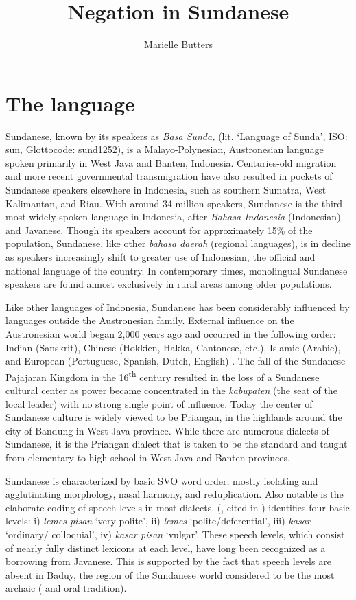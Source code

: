 \documentclass[output=paper]{langscibook}
\title{Negation in Sundanese}
\author{Marielle Butters\affiliation{University of Colorado at Boulder}}
\begin{document}
\maketitle

\section{The language}\label{sec:ngo:1}

Sundanese, known by its speakers as \textit{Basa Sunda,} (lit. ‘Language of Sunda’, ISO: \href{https://iso639-3.sil.org/code/sun}{sun}, Glottocode: \href{https://glottolog.org/resource/languoid/id/sund1252}{sund1252}), is a Malayo-Polynesian, Austronesian language spoken primarily in West Java and Banten, Indonesia. Centuries-old migration and more recent governmental transmigration have also resulted in pockets of Sundanese speakers elsewhere in Indonesia, such as southern Sumatra, West Kalimantan, and Riau. With around 34 million speakers, Sundanese is the third most widely spoken language in Indonesia, after \textit{Bahasa Indonesia} (Indonesian) and Javanese. Though its speakers account for approximately 15\% of the population, Sundanese, like other \textit{bahasa daerah} (regional languages), is in decline as speakers increasingly shift to greater use of Indonesian, the official and national language of the country. In contemporary times, monolingual Sundanese speakers are found almost exclusively in rural areas among older populations. 

Like other languages of Indonesia, Sundanese has been considerably influenced by languages outside the Austronesian family. External influence on the Austronesian world began 2,000 years ago and occurred in the following order: Indian (Sanskrit), Chinese (Hokkien, Hakka, Cantonese, etc.), Islamic (Arabic), and European (Portuguese, Spanish, Dutch, English) \citep{Blust2013}. The fall of the Sundanese Pajajaran Kingdom in the 16\textsuperscript{th} century resulted in the loss of a Sundanese cultural center as power became concentrated in the \textit{kabupaten} (the seat of the local leader) with no strong single point of influence. Today the center of Sundanese culture is widely viewed to be Priangan, in the highlands around the city of Bandung in West Java province. While there are numerous dialects of Sundanese, it is the Priangan dialect that is taken to be the standard and taught from elementary to high school in West Java and Banten provinces. 

Sundanese is characterized by basic SVO word order, mostly isolating and agglutinating morphology, nasal harmony, and reduplication. Also notable is the elaborate coding of speech levels in most dialects. \citeauthor{Lezer1931} (\citeyear{Lezer1931}, cited in \citealt{Wessing1974}) identifies four basic levels: i) \textit{lemes pisan} ‘very polite’, ii) \textit{lemes} ‘polite/deferential’, iii) \textit{kasar} ‘ordinary/ colloquial’, iv) \textit{kasar pisan} ‘vulgar’. These speech levels, which consist of nearly fully distinct lexicons at each level, have long been recognized as a borrowing from Javanese. This is supported by the fact that speech levels are absent in Baduy, the region of the Sundanese world considered to be the most archaic (\citealt{Gonda1948} and oral tradition). 
\end{document}
